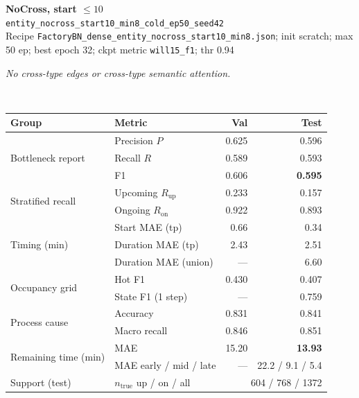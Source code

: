 \documentclass[9pt,a4paper,twocolumn]{extarticle}
\begin{document}
\noindent\begin{minipage}{\columnwidth}
\begin{center}
{\small\bfseries NoCross, start $\le 10$}\\
{\scriptsize\texttt{entity\_nocross\_start10\_min8\_cold\_ep50\_seed42}}\\
{\scriptsize Recipe \texttt{FactoryBN\_dense\_entity\_nocross\_start10\_min8.json}; init scratch; max 50 ep; best epoch 32; ckpt metric \texttt{will15\_f1}; thr 0.94}\\[1pt]
\parbox{0.96\columnwidth}{\scriptsize\itshape No cross-type edges or cross-type semantic attention.}\\[2pt]
\scriptsize\setlength{\tabcolsep}{3pt}
\begin{tabular}{llrr}
\toprule
Group & Metric & Val & Test \\
\midrule
\multirow{3}{*}{Bottleneck report}
  & Precision $P$ & 0.625 & 0.596 \\
  & Recall $R$ & 0.589 & 0.593 \\
  & F1 & 0.606 & \textbf{0.595} \\
\midrule
\multirow{2}{*}{Stratified recall}
  & Upcoming $R_{\mathrm{up}}$ & 0.233 & 0.157 \\
  & Ongoing $R_{\mathrm{on}}$ & 0.922 & 0.893 \\
\midrule
\multirow{3}{*}{Timing (min)}
  & Start MAE (tp) & 0.66 & 0.34 \\
  & Duration MAE (tp) & 2.43 & 2.51 \\
  & Duration MAE (union) & --- & 6.60 \\
\midrule
\multirow{2}{*}{Occupancy grid}
  & Hot F1 & 0.430 & 0.407 \\
  & State F1 (1 step) & --- & 0.759 \\
\midrule
\multirow{2}{*}{Process cause}
  & Accuracy & 0.831 & 0.841 \\
  & Macro recall & 0.846 & 0.851 \\
\midrule
\multirow{2}{*}{Remaining time (min)}
  & MAE & 15.20 & \textbf{13.93} \\
  & MAE early / mid / late & --- & 22.2 / 9.1 / 5.4 \\
\midrule
Support (test)
  & $n_{\mathrm{true}}$ up / on / all & \multicolumn{2}{r}{604 / 768 / 1372} \\
\bottomrule
\end{tabular}
\end{center}
\end{minipage}\par\vspace{6pt}
\end{document}
